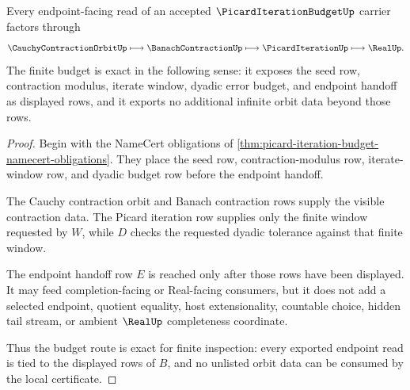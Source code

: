 \begin{theorem}
\label{thm:picard-iteration-budget-exactness}
Every endpoint-facing read of an accepted $\PicardIterationBudgetUp$ carrier factors through
$$
\CauchyContractionOrbitUp \longmapsto \BanachContractionUp \longmapsto \PicardIterationUp \longmapsto \RealUp .
$$
The finite budget is exact in the following sense: it exposes the seed row, contraction modulus, iterate window, dyadic error budget, and endpoint handoff as displayed rows, and it exports no additional infinite orbit data beyond those rows.
\end{theorem}
\begin{proof}
Begin with the NameCert obligations of \autoref{thm:picard-iteration-budget-namecert-obligations}. They place the seed row, contraction-modulus row, iterate-window row, and dyadic budget row before the endpoint handoff.

The Cauchy contraction orbit and Banach contraction rows supply the visible contraction data. The Picard iteration row supplies only the finite window requested by $W$, while $D$ checks the requested dyadic tolerance against that finite window.

The endpoint handoff row $E$ is reached only after those rows have been displayed. It may feed completion-facing or Real-facing consumers, but it does not add a selected endpoint, quotient equality, host extensionality, countable choice, hidden tail stream, or ambient $\RealUp$ completeness coordinate.

Thus the budget route is exact for finite inspection: every exported endpoint read is tied to the displayed rows of $B$, and no unlisted orbit data can be consumed by the local certificate.
\end{proof}

